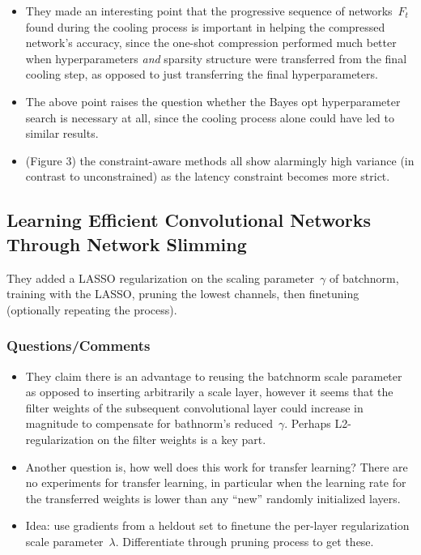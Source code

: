 \documentclass[a4paper, 12pt]{article}
\begin{document}
\begin{itemize}
        \item They made an interesting point that the progressive sequence of
                networks~$F_t$ found during the cooling process is important in
                helping the compressed network's accuracy, since the one-shot
                compression performed much better when hyperparameters
                \emph{and} sparsity structure were transferred from the final
                cooling step, as opposed to just transferring the final
                hyperparameters.

        \item The above point raises the question whether the Bayes opt
                hyperparameter search is necessary at all, since the cooling
                process alone could have led to similar results.

        \item (Figure 3) the constraint-aware methods all show alarmingly high
                variance (in contrast to unconstrained) as the latency
                constraint becomes more strict.
\end{itemize}


\subsection{Learning Efficient Convolutional Networks Through Network
            Slimming~\cite{liu2017learning}}

They added a LASSO regularization on the scaling parameter~$\gamma$ of
batchnorm, training with the LASSO, pruning the lowest channels, then
finetuning (optionally repeating the process).


\subsubsection{Questions/Comments}

\begin{itemize}
        \item They claim there is an advantage to reusing the batchnorm scale
                parameter as opposed to inserting arbitrarily a scale layer,
                however it seems that the filter weights of the subsequent
                convolutional layer could increase in magnitude to compensate
                for bathnorm's reduced~$\gamma$. Perhaps L2-regularization on
                the filter weights is a key part.

        \item Another question is, how well does this work for transfer
                learning? There are no experiments for transfer learning, in
                particular when the learning rate for the transferred weights
                is lower than any ``new'' randomly initialized layers.

        \item Idea: use gradients from a heldout set to finetune the per-layer
                regularization scale parameter~$\lambda$. Differentiate through
                pruning process to get these.
\end{itemize}
\end{document}
